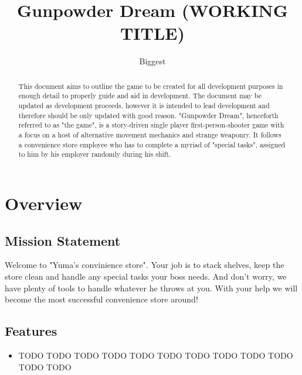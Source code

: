 \documentclass[10pt,a4paper]{article}
\author{Biggest}
\title{Gunpowder Dream (WORKING TITLE)}
\begin{document}
\maketitle
\newpage
\tableofcontents
\newpage

\begin{abstract}
This document aims to outline the game to be created for all development purposes in enough detail to properly guide and aid in development. The document may be updated as development proceeds, however it is intended to lead development and therefore should be only updated with good reason. "Gunpowder Dream", henceforth referred to as "the game", is a story-driven single player first-person-shooter game with a focus on a host of alternative movement mechanics and strange weaponry. It follows a convenience store employee who has to complete a myriad of "special tasks", assigned to him by his employer randomly during his shift. 
\end{abstract}
\newpage




\section{Overview}
\subsection{Mission Statement}
Welcome to "Yuma's convinience store". Your job is to stack shelves, keep the store clean and handle any special tasks your boss needs. And don't worry, we have plenty of tools to handle whatever he throws at you. With your help we will become the most successful convenience store around! 
\subsection{Features}
\begin{itemize}
 \item TODO TODO TODO TODO TODO TODO TODO TODO TODO TODO TODO TODO 
\end{itemize}
\end{document}
